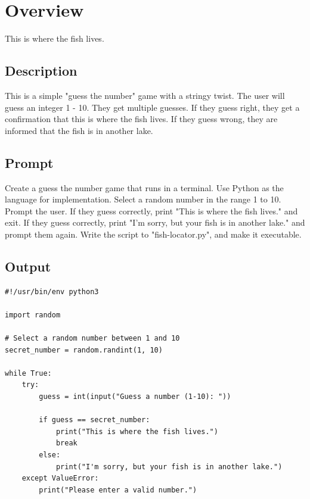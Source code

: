 \documentclass{article}
\begin{document}
\section*{Overview}
This is where the fish lives.

\subsection*{Description}
This is a simple "guess the number" game with a stringy twist. The user will guess an integer 1 - 10. They get multiple guesses. If they guess right, they get a confirmation that this is where the fish lives. If they guess wrong, they are informed that the fish is in another lake.

\subsection*{Prompt}
Create a guess the number game that runs in a terminal. Use Python as the language for implementation. Select a random number in the range 1 to 10. Prompt the user. If they guess correctly, print "This is where the fish lives." and exit. If they guess correctly, print "I'm sorry, but your fish is in another lake." and prompt them again. Write the script to "fish-locator.py", and make it executable.

\subsection*{Output}
\begin{verbatim}
#!/usr/bin/env python3

import random

# Select a random number between 1 and 10
secret_number = random.randint(1, 10)

while True:
    try:
        guess = int(input("Guess a number (1-10): "))

        if guess == secret_number:
            print("This is where the fish lives.")
            break
        else:
            print("I'm sorry, but your fish is in another lake.")
    except ValueError:
        print("Please enter a valid number.")
\end{verbatim}
\end{document}
